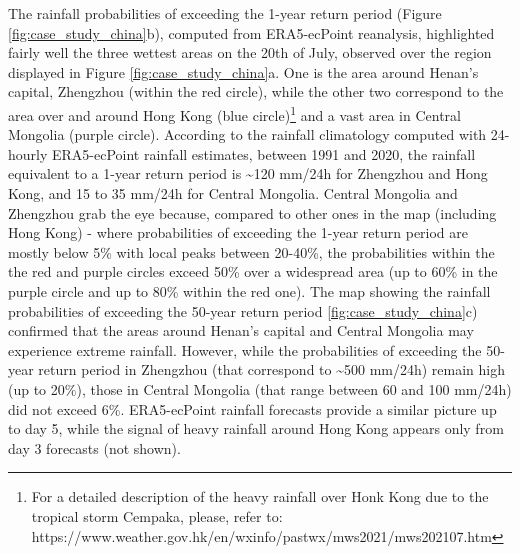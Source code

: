 The   rainfall probabilities of exceeding the 1-year return period (Figure \ref{fig:case_study_china}b), computed from ERA5-ecPoint reanalysis, highlighted fairly well the three wettest areas on the 20th of July, observed over the region displayed in Figure \ref{fig:case_study_china}a. One is the area around Henan's capital, Zhengzhou (within the red circle), while the other two correspond to the area over and around Hong Kong (blue circle)\footnote{For a detailed description of the heavy rainfall over Honk Kong due to the tropical storm Cempaka, please, refer to: https://www.weather.gov.hk/en/wxinfo/pastwx/mws2021/mws202107.htm} and a vast area in Central Mongolia (purple circle). According to the rainfall climatology computed with 24-hourly ERA5-ecPoint rainfall estimates, between 1991 and 2020, the rainfall equivalent to a 1-year return period is \sim120 mm/24h for Zhengzhou and Hong Kong, and 15 to 35 mm/24h for Central Mongolia. Central Mongolia and Zhengzhou grab the eye because, compared to other ones in the map (including Hong Kong) - where probabilities of exceeding the 1-year return period are mostly below 5\% with local peaks between 20-40\%, the probabilities within the the red and purple circles exceed 50\% over a widespread area (up to 60\% in the purple circle and up to 80\% within the red one). The map showing the rainfall probabilities of exceeding the 50-year return period \ref{fig:case_study_china}c) confirmed that the areas around Henan's capital and Central Mongolia may experience extreme rainfall. However, while the probabilities of exceeding the 50-year return period in Zhengzhou (that correspond to \sim500 mm/24h) remain high (up to 20\%), those in Central Mongolia (that range between 60 and 100 mm/24h) did not exceed 6\%. ERA5-ecPoint rainfall forecasts provide a similar picture up to day 5, while the signal of heavy rainfall around Hong Kong appears only from day 3 forecasts (not shown).

